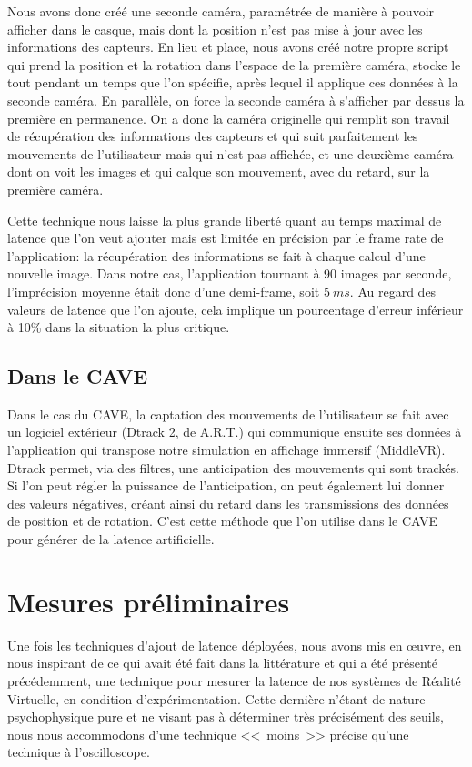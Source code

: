 	\par Nous avons donc créé une seconde caméra, paramétrée de manière à pouvoir afficher dans le casque, mais dont la position n'est pas mise à jour avec les informations des capteurs. En lieu et place, nous avons créé notre propre script qui prend la position et la rotation dans l'espace de la première caméra, stocke le tout pendant un temps que l'on spécifie, après lequel il applique ces données à la seconde caméra. En parallèle, on force la seconde caméra à s'afficher par dessus la première en permanence. On a donc la caméra originelle qui remplit son travail de récupération des informations des capteurs et qui suit parfaitement les mouvements de l'utilisateur mais qui n'est pas affichée, et une deuxième caméra dont on voit les images et qui calque son mouvement, avec du retard, sur la première caméra.
	
	\par Cette technique nous laisse la plus grande liberté quant au temps maximal de latence que l'on veut ajouter mais est limitée en précision par le frame rate de l'application: la récupération des informations se fait à chaque calcul d'une nouvelle image. Dans notre cas, l'application tournant à 90 images par seconde, l'imprécision moyenne était donc d'une demi-frame, soit $5~ms$. Au regard des valeurs de latence que l'on ajoute, cela implique un pourcentage d'erreur inférieur à 10\% dans la situation la plus critique.
	
	\subsection{Dans le CAVE}	
	\par Dans le cas du CAVE, la captation des mouvements de l'utilisateur se fait avec un logiciel extérieur (Dtrack 2, de A.R.T.) qui communique ensuite ses données à l'application qui transpose notre simulation en affichage immersif (MiddleVR). Dtrack permet, via des filtres, une anticipation des mouvements qui sont trackés. Si l'on peut régler la puissance de l'anticipation, on peut également lui donner des valeurs négatives, créant ainsi du retard dans les transmissions des données de position et de rotation. C'est cette méthode que l'on utilise dans le CAVE pour générer de la latence artificielle.
	
	
	\section{Mesures préliminaires}
	\label{sec:mesures_prelim_latence}
	\par Une fois les techniques d'ajout de latence déployées, nous avons mis en œuvre, en nous inspirant de ce qui avait été fait dans la littérature et qui a été présenté précédemment, une technique pour mesurer la latence de nos systèmes de Réalité Virtuelle, en condition d'expérimentation. Cette dernière n'étant de nature psychophysique pure et ne visant pas à déterminer très précisément des seuils, nous nous accommodons d'une technique <<~moins~>> précise qu'une technique à l'oscilloscope.
	

